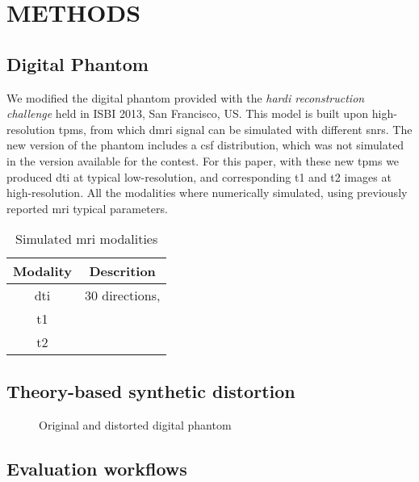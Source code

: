 \section{METHODS}

\subsection{Digital Phantom}
We modified the digital phantom provided with the
\emph{\gls*{hardi} reconstruction challenge} held
in ISBI 2013, San Francisco, US. This model is
built upon high-resolution \glspl*{tpm}, from which
\gls*{dmri} signal can be simulated with different
\glspl*{snr}. The new version of the phantom includes
a \gls*{csf} distribution, which was not simulated
in the version available for the contest. For this paper,
with these new \glspl*{tpm} we produced \gls*{dti} at
typical low-resolution, and corresponding \gls*{t1} and 
\gls*{t2} images at high-resolution. All the
modalities where numerically simulated, using previously
reported \gls*{mri} typical parameters.


\begin{table}[h]
\caption{Simulated \gls*{mri} modalities}
\label{table:phantom}
\begin{center}
\begin{tabular}{c|c}
\hline
Modality & Descrition \\
\hline
\gls*{dti} & 30 directions, \\
\hline
\gls*{t1} & \\
\hline
\gls*{t2} & \\
\hline
\end{tabular}
\end{center}
\end{table}


\subsection{Theory-based synthetic distortion}

   \begin{figure}[thpb]
      \centering
      \caption{Original and distorted digital phantom}
      \label{fig:label}
   \end{figure}
   

\subsection{Evaluation workflows}


